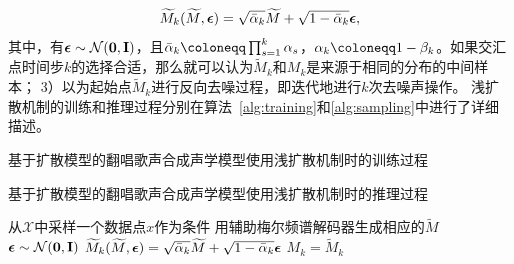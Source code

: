 \begin{equation}
\widetilde{M}_k(\widetilde{M}, {\boldsymbol{\epsilon}}) = \sqrt{\bar\alpha_k}\widetilde{M} + \sqrt{1-\bar\alpha_k}{\boldsymbol{\epsilon}},
\end{equation}
其中，有${\boldsymbol{\epsilon}}\sim\mathcal{N}(\mathbf{0}, \mathbf{I})$，且$\bar\alpha_k \defeq \prod_{s=1}^k \alpha_s$，$\alpha_k \defeq 1-\beta_k$。如果交汇点时间步$k$的选择合适，那么就可以认为$\widetilde{M}_k$和$M_k$是来源于相同的分布的中间样本；
3）以为起始点$\widetilde{M}_k$进行反向去噪过程，即迭代地进行$k$次去噪声操作。
浅扩散机制的训练和推理过程分别在算法~\ref{alg:training}和\ref{alg:sampling}中进行了详细描述。
\begin{algorithm}[!ht]
\caption{基于扩散模型的翻唱歌声合成声学模型使用浅扩散机制时的训练过程}
\label{alg:training}
\end{algorithm}
\begin{algorithm}[!h]
\caption{基于扩散模型的翻唱歌声合成声学模型使用浅扩散机制时的推理过程}
\label{alg:sampling}
    从$\mathcal{X}$中采样一个数据点$x$作为条件\;
    用辅助梅尔频谱解码器生成相应的$\widetilde{M}$\;
    ${\boldsymbol{\epsilon}}\sim\mathcal{N}(\mathbf{0},\mathbf{I})$\;
    $\widetilde{M}_k(\widetilde{M}, {\boldsymbol{\epsilon}}) = \sqrt{\bar\alpha_k}\widetilde{M} + \sqrt{1-\bar\alpha_k}{\boldsymbol{\epsilon}}$\;
    $M_k =  \widetilde{M}_k$\;
\end{algorithm}
